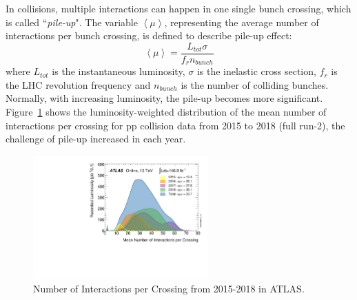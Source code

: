 In collisions, multiple interactions can happen in one single bunch crossing, which is called ``\textit{pile-up}".
The variable $\left< \mu \right>$, representing the average number of interactions per bunch crossing, 
is defined to describe pile-up effect:
\begin{equation}
	\left< \mu \right> = \frac{L_{tot}\sigma}{f_{r}n_{bunch}}
\end{equation}
where $L_{tot}$ is the instantaneous luminosity, $\sigma$ is the inelastic cross section,
$f_{r}$ is the LHC revolution frequency and $n_{bunch}$ is the number of colliding bunches.
Normally, with increasing luminosity, the pile-up becomes more significant.
Figure~\ref{fig:run2_mu} shows the luminosity-weighted distribution of the mean number of interactions per crossing
for pp collision data from 2015 to 2018 (full run-2), the challenge of pile-up increased in each year.
\begin{figure}[!htb]
  \centering
  \includegraphics[width=0.6\textwidth]{figures/Detector/mu_2015_2018.pdf}
  \caption{Number of Interactions per Crossing from 2015-2018 in ATLAS.}
  \label{fig:run2_mu}
\end{figure}
